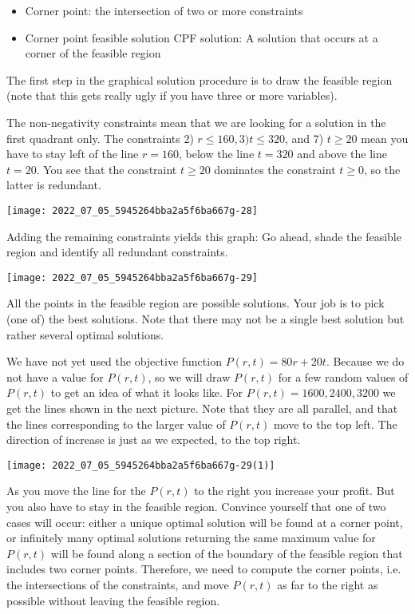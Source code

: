 \begin{itemize}
  \item Corner point: the intersection of two or more constraints

  \item Corner point feasible solution CPF solution: A solution that occurs at a corner of the feasible region

\end{itemize}
The first step in the graphical solution procedure is to draw the feasible region (note that this gets really ugly if you have three or more variables).

The non-negativity constraints mean that we are looking for a solution in the first quadrant only. The constraints 2) $r \leq 160,3) t \leq 320$, and 7) $t \geq 20$ mean you have to stay left of the line $r=160$, below the line $t=320$ and above the line $t=20$. You see that the constraint $t \geq 20$ dominates the constraint $t \geq 0$, so the latter is redundant.

\texttt{[image: 2022\_07\_05\_5945264bba2a5f6ba667g-28]}

Adding the remaining constraints yields this graph: Go ahead, shade the feasible region and identify all redundant constraints.

\texttt{[image: 2022\_07\_05\_5945264bba2a5f6ba667g-29]}

All the points in the feasible region are possible solutions. Your job is to pick (one of) the best solutions. Note that there may not be a single best solution but rather several optimal solutions.

We have not yet used the objective function $P(r, t)=80 r+20 t$. Because we do not have a value for $P(r, t)$, so we will draw $P(r, t)$ for a few random values of $P(r, t)$ to get an idea of what it looks like. For $P(r, t)=1600,2400,3200$ we get the lines shown in the next picture. Note that they are all parallel, and that the lines corresponding to the larger value of $P(r, t)$ move to the top left. The direction of increase is just as we expected, to the top right.

\texttt{[image: 2022\_07\_05\_5945264bba2a5f6ba667g-29(1)]}

As you move the line for the $P(r, t)$ to the right you increase your profit. But you also have to stay in the feasible region. Convince yourself that one of two cases will occur: either a unique optimal solution will be found at a corner point, or infinitely many optimal solutions returning the same maximum value for $P(r, t)$ will be found along a section of the boundary of the feasible region that includes two corner points. Therefore, we need to compute the corner points, i.e. the intersections of the constraints, and move $P(r, t)$ as far to the right as possible without leaving the feasible region.

